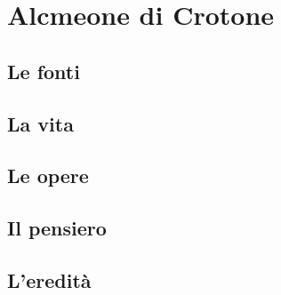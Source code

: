 \chapter{Alcmeone di Crotone}

\section{Le fonti}

\section{La vita}

\section{Le opere}

\section{Il pensiero}

\section{L'eredità}
